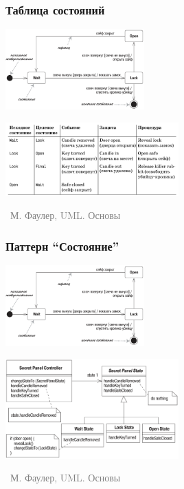 \documentclass[xetex,mathserif,serif]{beamer}
\newcommand{\attribution}[1] {
	\vspace{-5mm}\begin{flushright}\begin{scriptsize}\textcolor{gray}{\textcopyright\, #1}\end{scriptsize}\end{flushright}
}
\begin{document}
	\begin{frame}
		\frametitle{Таблица состояний}
		\begin{center}
			\includegraphics[width=0.4\textwidth]{stateTransitionSyntax.png}
		\end{center}

		\begin{center}
			\includegraphics[width=0.5\textwidth]{stateTransitionStateTable.png}
			\attribution{М. Фаулер, UML. Основы}
		\end{center}
	\end{frame}

	\begin{frame}
		\frametitle{Паттерн ``Состояние''}
		\begin{center}
			\includegraphics[width=0.4\textwidth]{stateTransitionSyntax.png}
		\end{center}

		\begin{center}
			\includegraphics[width=0.5\textwidth]{stateTransitionStatePattern.png}
			\attribution{М. Фаулер, UML. Основы}
		\end{center}
	\end{frame}
\end{document}
